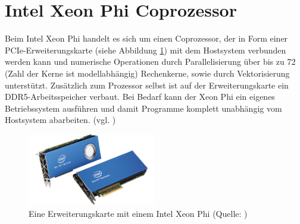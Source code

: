 \documentclass[../main.tex]{subfiles}
\begin{document}
\section{Intel Xeon Phi Coprozessor}
Beim Intel Xeon Phi handelt es sich um einen Coprozessor, der in Form einer PCIe-Erweiterungskarte (siehe Abbildung \ref{pic:xeonphicard}) mit dem Hostsystem verbunden werden kann und numerische Operationen durch Parallelisierung über bis zu 72 (Zahl der Kerne ist modellabhängig) Rechenkerne, sowie durch Vektorisierung unterstützt. Zusätzlich zum Prozessor selbst ist auf der Erweiterungskarte ein DDR5-Arbeitsspeicher verbaut. Bei Bedarf kann der Xeon Phi ein eigenes Betriebssystem ausführen und damit Programme komplett unabhängig vom Hostsystem abarbeiten. (vgl. \cite{intelxeonphiprocessors})
\begin{figure}
    \centering 
       \includegraphics[width=0.5\textwidth]{../images/Schmidt/xeon_phi_cards.png} 
    \caption {Eine Erweiterungskarte mit einem Intel Xeon Phi (Quelle: \parencite{intelMICarchitecture})} 
    \label{pic:xeonphicard} 
\end{figure} 
\end{document}
